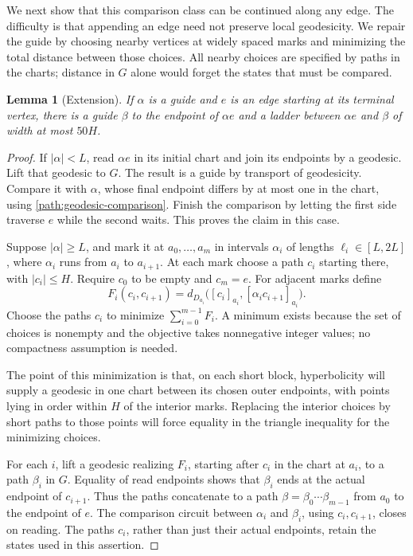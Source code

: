 \documentclass[11pt,reqno]{amsart}
\numberwithin{equation}{section}
\newtheorem{lemma}[theorem]{Lemma}
\theoremstyle{definition}
\theoremstyle{remark}
\begin{document}
We next show that this comparison class can be continued along any edge.
The difficulty is that appending an edge need not preserve local
geodesicity.  We repair the guide by choosing nearby vertices at widely
spaced marks and minimizing the total distance between those choices.
All nearby choices are specified by paths in the charts; distance in
$G$ alone would forget the states that must be compared.

\begin{lemma}[Extension]\label{path:extension}
If $\alpha$ is a guide and $e$ is an edge starting at its terminal vertex,
there is a guide $\beta$ to the endpoint of $\alpha e$ and a ladder
between $\alpha e$ and $\beta$ of width at most $50H$.
\end{lemma}

\begin{proof}
If $|\alpha|<L$, read $\alpha e$ in its initial chart and join its
endpoints by a geodesic.  Lift that geodesic to $G$.  The result is a
guide by transport of geodesicity.  Compare it with $\alpha$, whose
final endpoint differs by at most one in the chart, using
\eqref{path:geodesic-comparison}.  Finish the comparison by letting the
first side traverse $e$ while the second waits.  This proves the claim
in this case.

Suppose $|\alpha|\ge L$, and mark it at
$a_0,\ldots,a_m$ in intervals $\alpha_i$ of lengths
$\ell_i\in[L,2L]$, where $\alpha_i$ runs from $a_i$ to $a_{i+1}$.
At each mark choose a path $c_i$ starting there, with $|c_i|\le H$.
Require $c_0$ to be empty and $c_m=e$.  For adjacent marks define
\[
 F_i(c_i,c_{i+1})=
 d_{D_{a_i}}\bigl([c_i]_{a_i},[\alpha_i c_{i+1}]_{a_i}\bigr).
\]
Choose the paths $c_i$ to minimize $\sum_{i=0}^{m-1}F_i$.  A minimum
exists because the set of choices is nonempty and the objective takes
nonnegative integer values; no compactness assumption is needed.

The point of this minimization is that, on each short block,
hyperbolicity will supply a geodesic in one chart between its chosen
outer endpoints, with points lying in order within $H$ of the interior
marks.  Replacing the interior choices by short paths to those points
will force equality in the triangle inequality for the minimizing
choices.

For each $i$, lift a geodesic realizing $F_i$, starting after $c_i$ in
the chart at $a_i$, to a path $\beta_i$ in $G$.  Equality of read
endpoints shows that $\beta_i$ ends at the actual endpoint of $c_{i+1}$.
Thus the paths concatenate to a path
$\beta=\beta_0\cdots\beta_{m-1}$ from $a_0$ to the endpoint of $e$.
The comparison circuit between $\alpha_i$ and $\beta_i$, using
$c_i,c_{i+1}$, closes on reading.  The paths $c_i$, rather than just
their actual endpoints, retain the states used in this assertion.


\end{proof}
\end{document}
